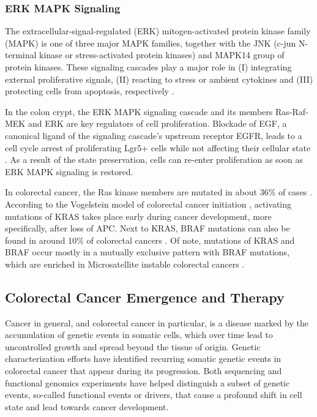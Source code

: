 \begin{flushleft}
\subsubsection{ERK MAPK Signaling}

The extracellular-signal-regulated (ERK) mitogen-activated protein kinase family (MAPK) is one of three major MAPK families, together with the JNK (c-jun N-terminal kinase or stress-activated protein kinases) and MAPK14 group of protein kinases. These signaling cascades play a major role in (I) integrating external proliferative signals, (II) reacting to stress or ambient cytokines and (III) protecting cells from apoptosis, respectively \cite{Oncol2005}. 

In the colon crypt, the ERK MAPK signaling cascade and its members Ras-Raf-MEK and ERK are key regulators of cell proliferation. Blockade of EGF, a canonical ligand of the signaling cascade's upstream receptor EGFR, leads to a cell cycle arrest of proliferating Lgr5+ cells while not affecting their cellular state \cite{basakInducedQuiescenceLgr52017a}. As a result of the state preservation, cells can re-enter proliferation as soon as ERK MAPK signaling is restored.

In colorectal cancer, the Ras kinase members are mutated in about 36\% of cases \cite{Oncol2005}. According to the Vogelstein model of colorectal cancer initiation \cite{Fearon1989}, activating mutations of KRAS takes place early during cancer development, more specifically, after loss of APC.
Next to KRAS, BRAF mutations can also be found in around 10\% of colorectal cancers \cite{Oncol2005}. Of note, mutations of KRAS and BRAF occur mostly in a mutually exclusive pattern with BRAF mutations, which are enriched in Microsatellite instable colorectal cancers \cite{Oncol2005, Sahin2013}. 


\subsection{Colorectal Cancer Emergence and Therapy}

Cancer in general, and colorectal cancer in particular, is a disease marked by the accumulation of genetic events in somatic cells, which over time lead to uncontrolled growth and spread beyond the tissue of origin. Genetic characterization efforts have identified recurring somatic genetic events in colorectal cancer that appear during its progression. Both sequencing and functional genomics experiments have helped distinguish a subset of genetic events, so-called functional events or drivers, that cause a profound shift in cell state and lead towards cancer development. 




\end{flushleft}
